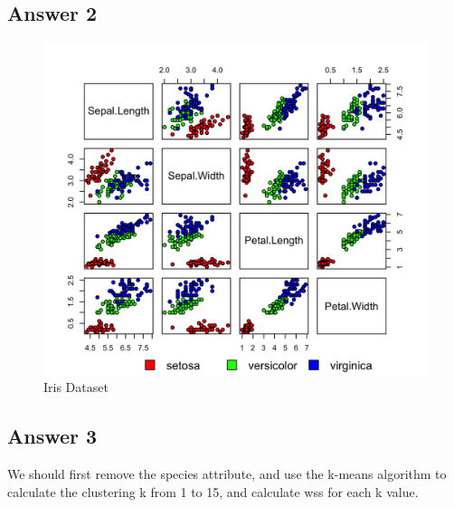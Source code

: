 \documentclass{article}
\begin{document}
\begin{figure}[H]
    \\
\end{figure}

\subsection{Answer 2}
\begin{figure}[H]
    \caption{Iris Dataset}
    \includegraphics[width=1\textwidth]{Fig3}
\end{figure}

\subsection{Answer 3}
We should first remove the species attribute, and use the k-means algorithm to calculate the clustering k from 1 to 15, and calculate wss for each k value.
\end{document}
